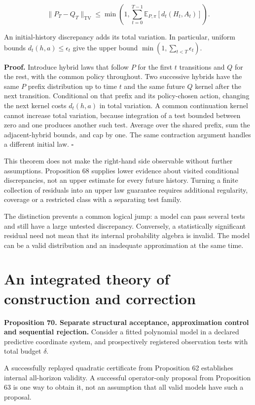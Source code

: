 \[
\boxed{
\|P_T-Q_T\|_{\mathrm{TV}}
\leq\min\left(1,\sum_{t=0}^{T-1}
\mathbb E_{P,\pi}[d_t(H_t,A_t)]\right).
}
\]

An initial-history discrepancy adds its total variation. In particular,
uniform bounds \(d_t(h,a)\leq\epsilon_t\) give the upper bound
\(\min(1,\sum_{t<T}\epsilon_t)\).

\textbf{Proof.} Introduce hybrid laws that follow \(P\) for the first
\(t\) transitions and \(Q\) for the rest, with the common policy
throughout. Two successive hybrids have the same \(P\) prefix
distribution up to time \(t\) and the same future \(Q\) kernel after the
next transition. Conditional on that prefix and its policy-chosen
action, changing the next kernel costs \(d_t(h,a)\) in total variation.
A common continuation kernel cannot increase total variation, because
integration of a test bounded between zero and one produces another such
test. Average over the shared prefix, sum the adjacent-hybrid bounds,
and cap by one. The same contraction argument handles a different
initial law. \(\square\)

This theorem does not make the right-hand side observable without
further assumptions. Proposition 68 supplies lower evidence about
visited conditional discrepancies, not an upper estimate for every
future history. Turning a finite collection of residuals into an upper
law guarantee requires additional regularity, coverage or a restricted
class with a separating test family.

The distinction prevents a common logical jump: a model can pass several
tests and still have a large untested discrepancy. Conversely, a
statistically significant residual need not mean that its internal
probability algebra is invalid. The model can be a valid distribution
and an inadequate approximation at the same time.

\section{An integrated theory of construction and correction}\label{LSM:an-integrated-theory-of-construction-and-correction}

\textbf{Proposition 70. Separate structural acceptance, approximation
control and sequential rejection.} Consider a fitted polynomial model in
a declared predictive coordinate system, and prospectively registered
observation tests with total budget \(\delta\).

A successfully replayed quadratic certificate from Proposition 62
establishes internal all-horizon validity. A successful operator-only
proposal from Proposition 63 is one way to obtain it, not an assumption
that all valid models have such a proposal.

